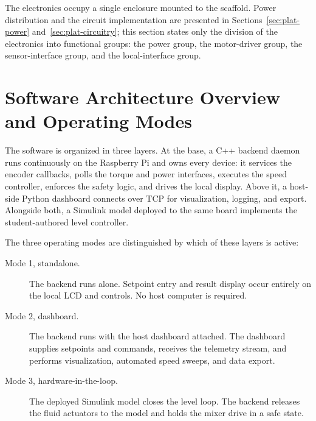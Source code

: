 The electronics occupy a single enclosure mounted to the scaffold. Power distribution and the circuit implementation are presented in Sections~\ref{sec:plat-power} and~\ref{sec:plat-circuitry}; this section states only the division of the electronics into functional groups: the power group, the motor-driver group, the sensor-interface group, and the local-interface group.


\section{Software Architecture Overview and Operating Modes}
\label{sec:arch-software}


The software is organized in three layers. At the base, a C++ backend daemon runs continuously on the Raspberry Pi and owns every device: it services the encoder callbacks, polls the torque and power interfaces, executes the speed controller, enforces the safety logic, and drives the local display. Above it, a host-side Python dashboard connects over TCP for visualization, logging, and export. Alongside both, a Simulink model deployed to the same board implements the student-authored level controller.

The three operating modes are distinguished by which of these layers is active:

\begin{description}
    \item[Mode 1, standalone.] The backend runs alone. Setpoint entry and result display occur entirely on the local LCD and controls. No host computer is required.
    \item[Mode 2, dashboard.] The backend runs with the host dashboard attached. The dashboard supplies setpoints and commands, receives the telemetry stream, and performs visualization, automated speed sweeps, and data export.
    \item[Mode 3, hardware-in-the-loop.] The deployed Simulink model closes the level loop. The backend releases the fluid actuators to the model and holds the mixer drive in a safe state.
\end{description}



